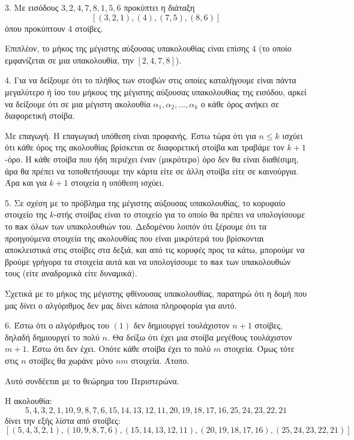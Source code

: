 \documentclass[a4paper,11pt]{article}
\begin{document}
3. Με εισόδους $3, 2, 4, 7, 8, 1, 5, 6$ προκύπτει η διάταξη
$$\left[(3, 2, 1), (4), (7, 5), (8, 6)\right]$$
όπου προκύπτουν 4 στοίβες.

Επιπλέον, το μήκος της μέγιστης αύξουσας υπακολουθίας είναι επίσης $4$ (το οποίο εμφανίζεται σε μια υπακολουθία, την $[2, 4, 7, 8]$).

4. Για να δείξουμε ότι το πλήθος των στοιβών στις οποίες καταλήγουμε είναι πάντα μεγαλύτερο ή ίσο του μήκους της μέγιστης αύξουσας υπακολουθίας της εισόδου, αρκεί να δείξουμε ότι σε μια μέγιστη ακολουθία $α_1, α_2, ..., α_k$ ο κάθε όρος ανήκει σε διαφορετική στοίβα.

Με επαγωγή. Η επαγωγική υπόθεση είναι προφανής. Έστω τώρα ότι για $n \leq k$ ισχύει ότι κάθε όρος της ακολουθίας βρίσκεται σε διαφορετική στοίβα και τραβάμε τον $k+1$-όρο. Η κάθε στοίβα που ήδη περιέχει έναν (μικρότερο) όρο δεν θα είναι διαθέσιμη, άρα θα πρέπει να τοποθετήσουμε την κάρτα είτε σε άλλη στοίβα είτε σε καινούργια. Άρα και για $k+1$ στοιχεία η υπόθεση ισχύει.

5. Σε σχέση με το πρόβλημα της μέγιστης αύξουσας υπακολουθίας, το κορυφαίο στοιχείο της $k$-στής στοίβας είναι το στοιχείο για το οποίο θα πρέπει να υπολογίσουμε το \verb|max| όλων των υπακολουθιών του. Δεδομένου λοιπόν ότι ξέρουμε ότι τα προηγούμενα στοιχεία της ακολουθίας που είναι μικρότερά του βρίσκονται αποκλειστικά στις στοίβες στα δεξιά, και από τις κορυφές προς τα κάτω, μπορούμε να βρούμε γρήγορα τα στοιχεία αυτά και να υπολογίσουμε το \verb|max| των υπακολουθιών τους (είτε αναδρομικά είτε δυναμικά).

Σχετικά με το μήκος της μέγιστης φθίνουσας υπακολουθίας, παρατηρώ ότι η δομή που μας δίνει ο αλγόριθμος δεν μας δίνει κάποια πληροφορία για αυτό.

6. Έστω ότι ο αλγόριθμος του $(1)$ δεν δημιουργεί τουλάχιστον $n+1$ στοίβες, δηλαδή δημιουργεί το πολύ $n$. Θα δείξω ότι έχει μια στοίβα μεγέθους τουλάχιστον $m+1$. Έστω ότι δεν έχει. Οπότε κάθε στοίβα έχει το πολύ $m$ στοιχεία. Όμως τότε στις $n$ στοίβες θα χωράνε μόνο $nm$ στοιχεία. Άτοπο.

Αυτό συνδέεται με το θεώρημα του Περιστερώνα.

Η ακολουθία:
$$5, 4, 3, 2, 1, 10, 9, 8, 7, 6, 15, 14, 13, 12, 11, 20, 19, 18, 17, 16, 25, 24, 23, 22, 21$$
δίνει την εξής λίστα από στοίβες:
$$\left[(5, 4, 3, 2, 1), (10, 9, 8, 7, 6), (15, 14, 13, 12, 11), (20, 19, 18, 17, 16), (25, 24, 23, 22, 21)\right]$$
\end{document}
